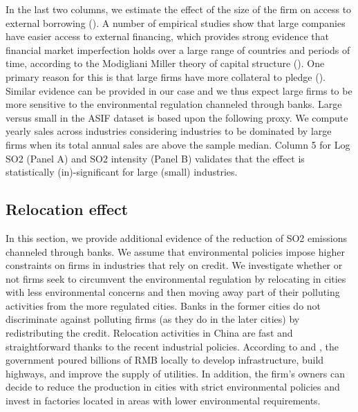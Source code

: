\documentclass[12pt]{article}
\begin{document}
In the last two columns, we estimate the effect of the size of the firm on access to external borrowing (\cite{Beck2006-qy}). A number of empirical studies show that large companies have easier access to external financing, which provides strong evidence that financial market imperfection holds over a large range of countries and periods of time, according to the Modigliani Miller theory of capital structure (\cite{Modigliani1958-nu}). One primary reason for this is that large firms have more collateral to pledge (\cite{Andersen2015-pa}). Similar evidence can be provided in our case and we thus expect large firms to be more sensitive to the environmental regulation channeled through banks. Large versus small in the ASIF dataset is based upon the following proxy. We compute yearly sales across industries considering industries to be dominated by large firms when its total annual sales are above the sample median. Column 5 for Log SO2 (Panel A) and SO2 intensity (Panel B) validates that the effect is statistically (in)-significant for large (small) industries.

\subsection{Relocation effect}

In this section, we provide additional evidence of the reduction of SO2 emissions channeled through banks. We assume that environmental policies impose higher constraints on firms in industries that rely on credit. We investigate whether or not firms seek to circumvent the environmental regulation by relocating in cities with less environmental concerns and then moving away part of their polluting activities from the more regulated cities. Banks in the former cities do not discriminate against polluting firms (as they do in the later cities) by redistributing the credit. Relocation activities in China are fast and straightforward thanks to the recent industrial policies. According to \cite{Wang2013-tb} and \cite{Alder2016-rl}, the government poured billions of RMB locally to develop infrastructure, build highways, and improve the supply of utilities. In addition, the firm’s owners can decide to reduce the production in cities with strict environmental policies and invest in factories located in areas with lower environmental requirements.
\end{document}
